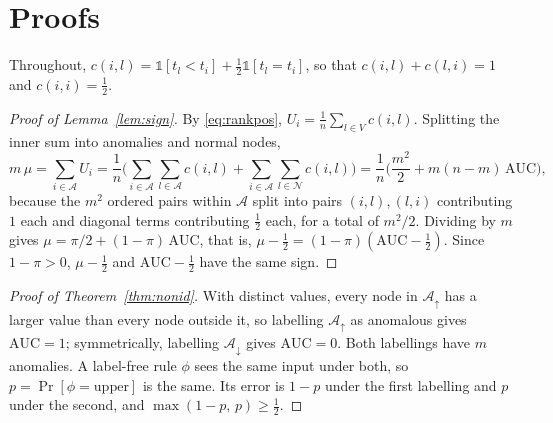 \section{Proofs}\label{app:proofs}

Throughout, $c(i,l) = \mathbb{1}[t_l < t_i] + \tfrac12\mathbb{1}[t_l = t_i]$, so that $c(i,l) + c(l,i) = 1$ and $c(i,i) = \tfrac12$.

\begin{proof}[Proof of Lemma~\ref{lem:sign}]
By \eqref{eq:rankpos}, $U_i = \frac1n\sum_{l\in V} c(i,l)$. Splitting the inner sum into anomalies and normal nodes,
\[
m\,\mu = \sum_{i\in\mathcal{A}} U_i
= \frac1n\Big(\sum_{i\in\mathcal{A}}\sum_{l\in\mathcal{A}} c(i,l) + \sum_{i\in\mathcal{A}}\sum_{l\in\mathcal{N}} c(i,l)\Big)
= \frac1n\Big(\frac{m^2}{2} + m(n-m)\,\mathrm{AUC}\Big),
\]
because the $m^2$ ordered pairs within $\mathcal{A}$ split into pairs $(i,l),(l,i)$ contributing $1$ each and diagonal terms contributing $\tfrac12$ each, for a total of $m^2/2$. Dividing by $m$ gives $\mu = \pi/2 + (1-\pi)\,\mathrm{AUC}$, that is, $\mu - \tfrac12 = (1-\pi)(\mathrm{AUC} - \tfrac12)$. Since $1 - \pi > 0$, $\mu - \tfrac12$ and $\mathrm{AUC} - \tfrac12$ have the same sign.
\end{proof}

\begin{proof}[Proof of Theorem~\ref{thm:nonid}]
With distinct values, every node in $\mathcal{A}_\uparrow$ has a larger value than every node outside it, so labelling $\mathcal{A}_\uparrow$ as anomalous gives $\mathrm{AUC} = 1$; symmetrically, labelling $\mathcal{A}_\downarrow$ gives $\mathrm{AUC} = 0$. Both labellings have $m$ anomalies. A label-free rule $\phi$ sees the same input under both, so $p = \Pr[\phi = \text{upper}]$ is the same. Its error is $1 - p$ under the first labelling and $p$ under the second, and $\max(1-p,\,p) \ge \tfrac12$.
\end{proof}

